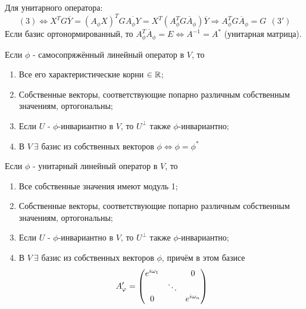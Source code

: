 Для унитарного оператора:
$$(3) \Longleftrightarrow X^TG\overline{Y} = (A_\phi X)^TG\overline{A_\phi Y} = X^T(A_\phi^TG\overline{A}_\phi)\overline{Y} \Longrightarrow A_\phi^TG\overline{A}_\phi = G  \ \ (3')$$
Если базис ортонормированный, то $A_\phi^T\overline{A}_\phi = E \Longleftrightarrow A^{-1} = A^*$ (унитарная матрица).

\begin{theorem}
    Если $\phi$ - самосопряжённый линейный оператор в $V$, то
    \begin{enumerate}
        \item Все его характеристические корни $\in \mathbb{R}$;
        \item Собственные векторы, соответствующие попарно различным собственным значениям, ортогональны;
        \item Если $U$ - $\phi$-инвариантно в $V$, то $U^\perp$ также $\phi$-инвариантно;
        \item В $V \ \exists$ базис из собственных векторов $\phi \Longleftrightarrow \phi = \phi^*$   
    \end{enumerate}
\end{theorem}
\begin{theorem}
    Если $\phi$ - унитарный линейный оператор в $V$, то 
    \begin{enumerate}
        \item Все собственные значения имеют модуль 1;
        \item Собственные векторы, соответствующие попарно различным собственным значениям, ортогональны;
        \item Если $U$ - $\phi$-инвариантно в $V$, то $U^\perp$ также $\phi$-инвариантно;
        \item В $V \ \exists$ базис из собственных векторов $\phi$, причём в этом базисе
        $$A'_\phi = \begin{pmatrix}e^{i\omega_1}&\null&0\\\null&\ddots&\null\\0&\null&e^{i\omega_n}\end{pmatrix}$$
    \end{enumerate}
\end{theorem}
